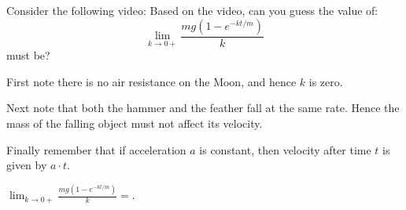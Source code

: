 \documentclass{ximera}
\begin{document}




 
\begin{problem}
Consider the following video: 
Based on the video, can you guess the value of:
\[
\lim_{k\to 0+} \frac{mg(1-e^{-kt/m})}{k}
\]
must be?
\begin{hint}
First note there is no air resistance on the Moon, and hence $k$ is
zero.
\end{hint}
\begin{hint}
Next note that both the hammer and the feather fall at the same rate.
Hence the mass of the falling object must not affect its velocity.
\end{hint}
\begin{hint}
Finally remember that if acceleration $a$ is constant, then velocity
after time $t$ is given by $a\cdot t$.
\end{hint}
\begin{prompt}
$\lim_{k\to 0+}\frac{mg(1-e^{-kt/m})}{k} = $.
\end{prompt}
\end{problem}
\end{document}
